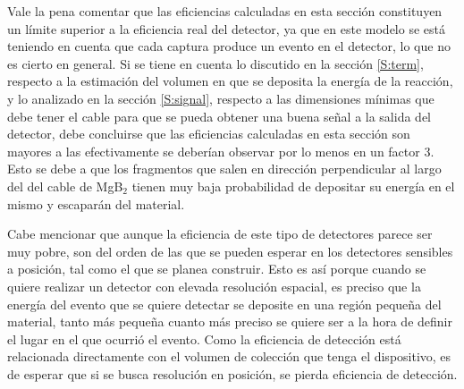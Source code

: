 Vale la pena comentar que las eficiencias calculadas en esta sección constituyen un límite superior a la eficiencia real del detector, ya que en este modelo se está teniendo en cuenta que cada captura produce un evento en el detector, lo que no es cierto en general. Si se tiene en cuenta lo discutido en la sección \ref{S:term}, respecto a la estimación del volumen en que se deposita la energía de la reacción, y lo analizado en la sección \ref{S:signal}, respecto a las dimensiones mínimas que debe tener el cable para que se pueda obtener una buena señal a la salida del detector, debe concluirse que las eficiencias calculadas en esta sección son mayores a las efectivamente se deberían observar por lo menos en un factor 3. Esto se debe a que los fragmentos que salen en dirección perpendicular al largo del del cable de MgB$_2$ tienen muy baja probabilidad de depositar su energía en el mismo y escaparán del material.

Cabe mencionar que aunque la eficiencia de este tipo de detectores parece ser muy pobre, son del orden de las que se pueden esperar en los detectores sensibles a posición, tal como el que se planea construir. Esto es así porque cuando se quiere realizar un detector con elevada resolución espacial, es preciso que la energía del evento que se quiere detectar se deposite en una región pequeña del material, tanto más pequeña cuanto más preciso se quiere ser a la hora de definir el lugar en el que ocurrió el evento. Como la eficiencia de detección está relacionada directamente con el volumen de colección que tenga el dispositivo, es de esperar que si se busca resolución en posición, se pierda eficiencia de detección.

